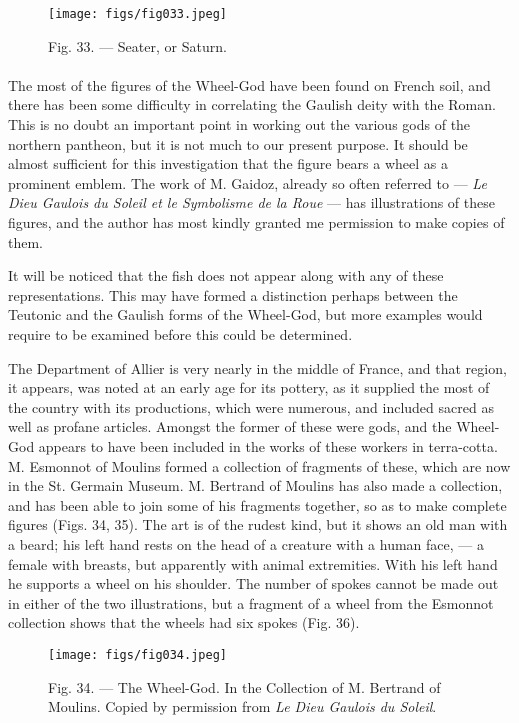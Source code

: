 \documentclass[a4paper, 11pt, oneside, polutonikogreek, english]{article}
\begin{document}
\begin{figure}[H]
\centering
\texttt{[image: figs/fig033.jpeg]}
\caption{Fig. 33. --- Seater, or Saturn.}
\end{figure}
\paragraph{}
The most of the figures of the Wheel-God have been found on French soil, and there has been some difficulty in correlating the Gaulish deity with the Roman. This is no doubt an important point in working out the various gods of the northern pantheon, but it is not much to our present purpose. It should be almost sufficient for this investigation that the figure bears a wheel as a prominent emblem. The work of M. Gaidoz, already so often referred to --- \emph{Le Dieu Gaulois du Soleil et le Symbolisme de la Roue} --- has illustrations of these figures, and the author has most kindly granted me permission to make copies of them.

It will be noticed that the fish does not appear along with any of these representations. This may have formed a distinction perhaps between the Teutonic and the Gaulish forms of the Wheel-God, but more examples would require to be examined before this could be determined.

The Department of Allier is very nearly in the middle of France, and that region, it appears, was noted at an early age for its pottery, as it supplied the most of the country with its productions, which were numerous, and included sacred as well as profane articles. Amongst the former of these were gods, and the Wheel-God appears to have been included in the works of these workers in terra-cotta. M. Esmonnot of Moulins formed a collection of fragments of these, which are now in the St. Germain Museum. M. Bertrand of Moulins has also made a collection, and has been able to join some of his fragments together, so as to make complete figures (Figs. 34, 35). The art is of the rudest kind, but it shows an old man with a beard; his left hand rests on the head of a creature with a human face, --- a female with breasts, but apparently with animal extremities. With his left hand he supports a wheel on his shoulder. The number of spokes cannot be made out in either of the two illustrations, but a fragment of a wheel from the Esmonnot collection shows that the wheels had six spokes (Fig. 36).

\begin{figure}[H]
\centering
\texttt{[image: figs/fig034.jpeg]}
\caption[Fig. 34. --- The Wheel-God.]{Fig. 34. --- The Wheel-God. In the Collection of M. Bertrand of Moulins. Copied by permission from \emph{Le Dieu Gaulois du Soleil}.}
\end{figure}
\end{document}
